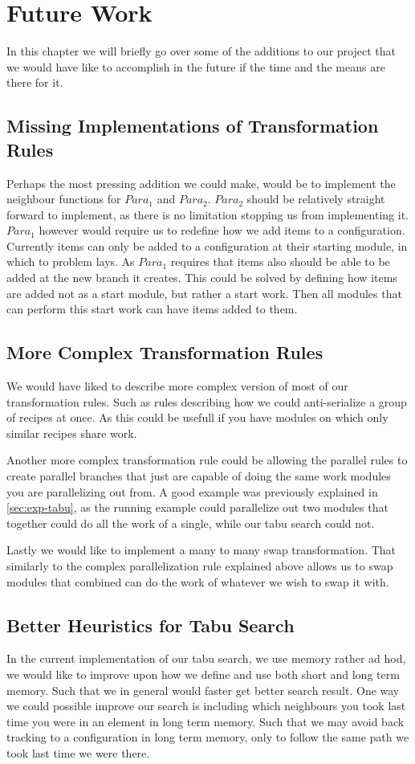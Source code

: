 \chapter{Future Work}
In this chapter we will briefly go over some of the additions to our project that we would have like to accomplish in the future if the time and the means are there for it.


\section{Missing Implementations of Transformation Rules}
Perhaps the most pressing addition we could make, would be to implement the neighbour functions for $Para_1$ and $Para_2$. $Para_2$ should be relatively straight forward to implement, as there is no limitation stopping us from implementing it. $Para_1$ however would require us to redefine how we add items to a configuration. Currently items can only be added to a configuration at their starting module, in which to problem lays. As $Para_1$ requires that items also should be able to be added at the new branch it creates. This could be solved by defining how items are added not as a start module, but rather a start work. Then all modules that can perform this start work can have items added to them.

\section{More Complex Transformation Rules}
We would have liked to describe more complex version of most of our transformation rules. Such as rules describing how we could anti-serialize a group of recipes at once. As this could be usefull if you have modules on which only similar recipes share work.

Another more complex transformation rule could be allowing the parallel rules to create parallel branches that just are capable of doing the same work modules you are parallelizing out from. A good example was previously explained in \cref{sec:exp-tabu}, as the running example could parallelize out two modules that together could do all the work of a single, while our tabu search could not.

Lastly we would like to implement a many to many swap transformation. That similarly to the complex parallelization rule explained above allows us to swap modules that combined can do the work of whatever we wish to swap it with.

\section{Better Heuristics for Tabu Search}
In the current implementation of our tabu search, we use memory rather ad hod, we would like to improve upon how we define and use both short and long term memory. Such that we in general would faster get better search result. One way we could possible improve our search is including which neighbours you took last time you were in an element in long term memory. Such that we may avoid back tracking to a configuration in long term memory, only to follow the same path we took last time we were there. 

 



